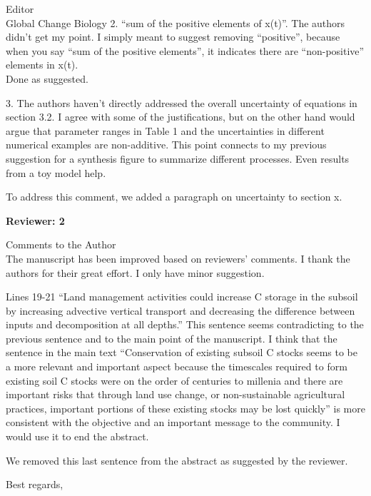\documentclass[11pt]{bgcletter}
\newcommand{\answer}[1] {
{\color{cyan} #1}
}
\begin{document}
\begin{letter}{Editor\\
   Global Change Biology
}
2. ``sum of the positive elements of x(t)''. The authors didn't get my point. I simply meant to suggest removing ``positive'', because when you say ``sum of the positive elements'', it indicates there are ``non-positive'' elements in x(t). \\
\answer{Done as suggested.}

3. The authors haven't directly addressed the overall uncertainty of equations in section 3.2. I agree with some of the justifications, but on the other hand would argue that parameter ranges in Table 1 and the uncertainties in different numerical examples are non-additive. This point connects to my previous suggestion for a synthesis figure to summarize different processes. Even results from a toy model help.

\answer{To address this comment, we added a paragraph on uncertainty to section x. }


\newpage

\textbf{Reviewer: 2}

Comments to the Author \\
The manuscript has been improved based on reviewers’ comments. I thank the authors for their great effort. I only have minor suggestion.

Lines 19-21 “Land management activities could increase C storage in the subsoil by increasing advective vertical transport and decreasing the difference between inputs and decomposition at all depths.” This sentence seems contradicting to the previous sentence and to the main point of the manuscript. I think that the sentence in the main text “Conservation of existing subsoil C stocks seems to be a more relevant and important aspect because the timescales required to form existing soil C stocks were on the order of centuries to millenia and there are important risks that through land use change, or non-sustainable agricultural practices, important portions of these existing stocks may be lost quickly” is more consistent with the objective and an important message to the community. I would use it to end the abstract.

\answer{We removed this last sentence from the abstract as suggested by the reviewer.}

 \closing{Best regards,} 
 \end{letter}

 
\end{document}
